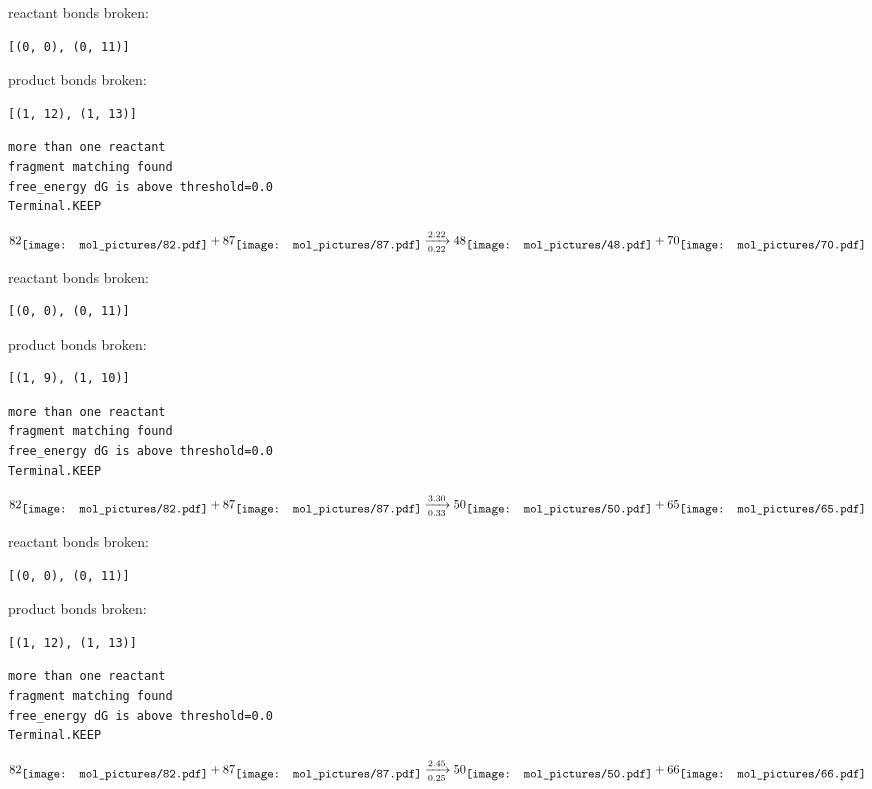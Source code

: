 \documentclass{article}
\begin{document}
reactant bonds broken:\begin{verbatim}
[(0, 0), (0, 11)]
\end{verbatim}
product bonds broken:\begin{verbatim}
[(1, 12), (1, 13)]
\end{verbatim}




\vspace{1cm}
\begin{verbatim}
more than one reactant
fragment matching found
free_energy dG is above threshold=0.0
Terminal.KEEP
\end{verbatim}
$$
82
\raisebox{-.5\height}{\texttt{[image: mol\_pictures/82.pdf]}}
+
87
\raisebox{-.5\height}{\texttt{[image: mol\_pictures/87.pdf]}}
\xrightarrow[0.22]{2.22}
48
\raisebox{-.5\height}{\texttt{[image: mol\_pictures/48.pdf]}}
+
70
\raisebox{-.5\height}{\texttt{[image: mol\_pictures/70.pdf]}}
$$


reactant bonds broken:\begin{verbatim}
[(0, 0), (0, 11)]
\end{verbatim}
product bonds broken:\begin{verbatim}
[(1, 9), (1, 10)]
\end{verbatim}




\vspace{1cm}
\begin{verbatim}
more than one reactant
fragment matching found
free_energy dG is above threshold=0.0
Terminal.KEEP
\end{verbatim}
$$
82
\raisebox{-.5\height}{\texttt{[image: mol\_pictures/82.pdf]}}
+
87
\raisebox{-.5\height}{\texttt{[image: mol\_pictures/87.pdf]}}
\xrightarrow[0.33]{3.30}
50
\raisebox{-.5\height}{\texttt{[image: mol\_pictures/50.pdf]}}
+
65
\raisebox{-.5\height}{\texttt{[image: mol\_pictures/65.pdf]}}
$$


reactant bonds broken:\begin{verbatim}
[(0, 0), (0, 11)]
\end{verbatim}
product bonds broken:\begin{verbatim}
[(1, 12), (1, 13)]
\end{verbatim}




\vspace{1cm}
\begin{verbatim}
more than one reactant
fragment matching found
free_energy dG is above threshold=0.0
Terminal.KEEP
\end{verbatim}
$$
82
\raisebox{-.5\height}{\texttt{[image: mol\_pictures/82.pdf]}}
+
87
\raisebox{-.5\height}{\texttt{[image: mol\_pictures/87.pdf]}}
\xrightarrow[0.25]{2.45}
50
\raisebox{-.5\height}{\texttt{[image: mol\_pictures/50.pdf]}}
+
66
\raisebox{-.5\height}{\texttt{[image: mol\_pictures/66.pdf]}}
$$
\end{document}
